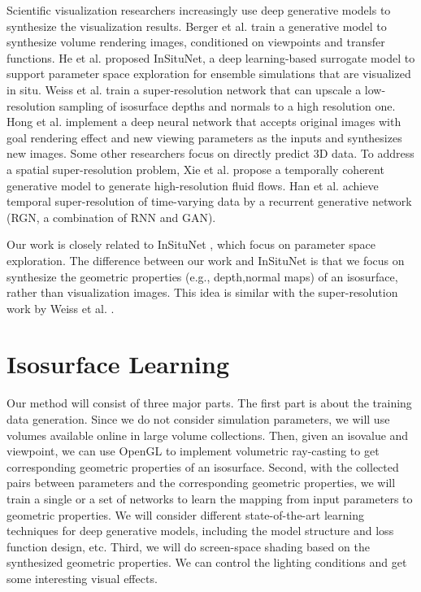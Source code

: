 \documentclass[journal]{vgtc}                %
\begin{document}
Scientific visualization researchers increasingly use deep generative models to synthesize the visualization results. Berger et al. \cite{berger2018generative} train a generative model to synthesize volume rendering images, conditioned on viewpoints and transfer functions. He et al. \cite{he2019insitunet} proposed InSituNet, a deep learning-based surrogate model to support parameter space exploration for ensemble simulations that are visualized in situ. Weiss et al. \cite{weiss2019volumetric} train a super-resolution network that can upscale a low-resolution sampling of isosurface depths and normals to a high resolution one. Hong et al. \cite{hong2019dnn} implement a deep neural network that accepts original images with goal rendering effect and new viewing parameters as the inputs and synthesizes new images. Some other researchers focus on directly predict 3D data. To address a spatial super-resolution problem, Xie et al. \cite{xie2018tempogan} propose a temporally coherent generative model to generate high-resolution fluid flows. Han et al. \cite{han2019tsr} achieve temporal super-resolution of time-varying data by a recurrent generative network (RGN, a combination of RNN and GAN).

Our work is closely related to InSituNet \cite{he2019insitunet}, which focus on parameter space exploration. The difference between our work and InSituNet is that we focus on synthesize the  geometric properties (e.g., depth,normal maps) of an isosurface, rather than visualization images. This idea is similar with the super-resolution work by Weiss et al. \cite{weiss2019volumetric}. 


\section{Isosurface Learning}

Our method will consist of three major parts. The first part is about the training data generation. Since we do not consider simulation parameters, we will use volumes available online in large volume collections. Then, given an isovalue and viewpoint, we can use OpenGL \cite{woo1999opengl} to implement volumetric ray-casting to get corresponding geometric properties of an isosurface. Second, with the collected pairs between parameters and the corresponding geometric properties, we will train a single or a set of networks to learn the mapping from input parameters to geometric properties. We will consider different state-of-the-art learning techniques for deep generative models, including the model structure and loss function design, etc. Third, we will do screen-space shading based on the synthesized geometric properties. We can control the lighting conditions and get some interesting visual effects. 
\end{document}
